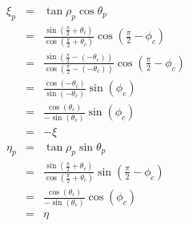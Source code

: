     \begin{eqnarray}
      \xi_p & = & \tan\rho_p \cos\theta_p \\
            & = & \frac{\sin(\frac{\pi}{2} + \theta_c)}{\cos(\frac{\pi}{2} + \theta_c)} \cos(\frac{\pi}{2} - \phi_c) \\
	    & = & \frac{\sin(\frac{\pi}{2} -(-\theta_c))}{\cos(\frac{\pi}{2} - (-\theta_c))} \cos(\frac{\pi}{2} - \phi_c) \\
	    & = & \frac{\cos(-\theta_c)}{\sin(-\theta_c)} \sin(\phi_c) \\
	    & = & \frac{\cos(\theta_c)}{-\sin(\theta_c)}\sin(\phi_c) \\
	    & = & -\xi \\ 
      \eta_p & = & \tan\rho_p \sin\theta_p \\
             & = & \frac{\sin(\frac{\pi}{2} + \theta_c)}{\cos(\frac{\pi}{2} + \theta_c)} \sin(\frac{\pi}{2} - \phi_c) \\
	     & = & \frac{\cos(\theta_c)}{-\sin(\theta_c)} \cos(\phi_c) \\
	     & = & \eta
    \end{eqnarray}


